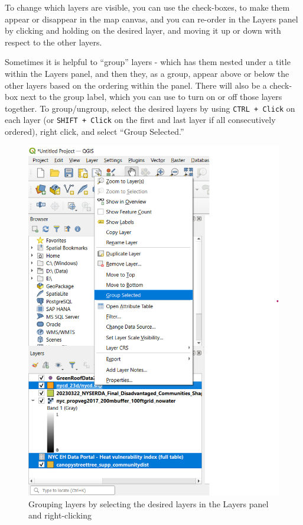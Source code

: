 \documentclass[
  letterpaper,
  DIV=11,
  numbers=noendperiod]{scrreprt}
\begin{document}
To change which layers are visible, you can use the check-boxes, to make
them appear or disappear in the map canvas, and you can re-order in the
Layers panel by clicking and holding on the desired layer, and moving it
up or down with respect to the other layers.

Sometimes it is helpful to ``group'' layers - which has them nested
under a title within the Layers panel, and then they, as a group, appear
above or below the other layers based on the ordering within the panel.
There will also be a check-box next to the group label, which you can
use to turn on or off those layers together. To group/ungroup, select
the desired layers by using \texttt{CTRL\ +\ Click} on each layer (or
\texttt{SHIFT\ +\ Click} on the first and last layer if all
consecutively ordered), right click, and select ``Group Selected.''

\begin{figure}

{\centering \includegraphics{./images/grouping.png}

}

\caption{Grouping layers by selecting the desired layers in the Layers
panel and right-clicking}

\end{figure}
\end{document}
